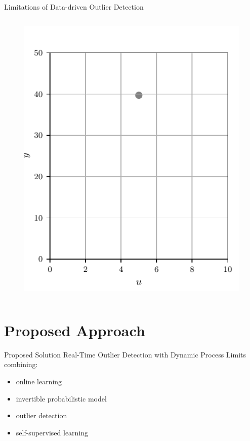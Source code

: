 \documentclass[aspectratio=169]{beamer}
\begin{document}
\begin{frame}{Limitations of Data-driven Outlier Detection}
\begin{columns}
\begin{column}{0.38\textwidth}
{\begin{figure}
                    \includegraphics[width=\textwidth]{../ilustrate/pc2023/sample/unlabeled_data_0.pdf}
                \end{figure}
            }
        \end{column}
    \end{columns}

\end{frame}

\section{Proposed Approach}

\begin{frame}{Proposed Solution}
    Real-Time Outlier Detection with Dynamic Process Limits
    combining:
    \begin{itemize}
        \item online learning
        \item invertible probabilistic model
        \item outlier detection
        \item self-supervised learning
    \end{itemize}
\end{frame}
\end{document}
